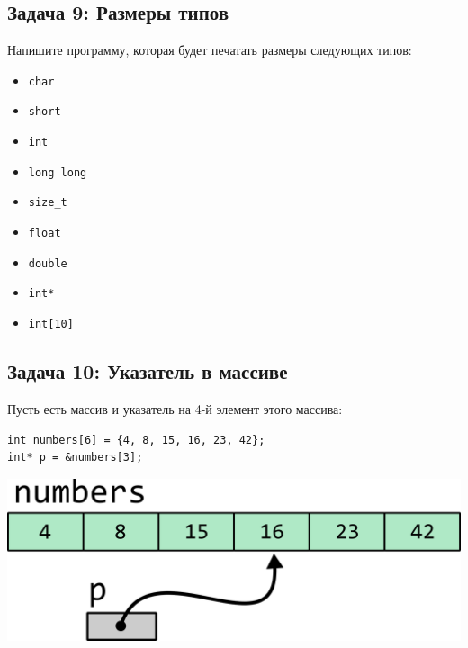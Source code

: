\documentclass{article}
\begin{document}
\subsection*{Задача 9: Размеры типов}
Напишите программу, которая будет печатать размеры следующих типов:
\begin{multicols}{3}
\begin{itemize}
\item \texttt{char}
\item \texttt{short}
\item \texttt{int}
\item \texttt{long long}
\item \texttt{size\_t}
\item \texttt{float}
\item \texttt{double}
\item \texttt{int*}
\item \texttt{int[10]}
\end{itemize}
\end{multicols}

\subsection*{Задача 10: Указатель в массиве}
Пусть есть массив и указатель на 4-й элемент этого массива:
\begin{lstlisting}
int numbers[6] = {4, 8, 15, 16, 23, 42};
int* p = &numbers[3];
\end{lstlisting}

\begin{center}
\includegraphics[scale=0.7]{../images/pointer_task_arithmetics.png}
\end{center}
\end{document}
